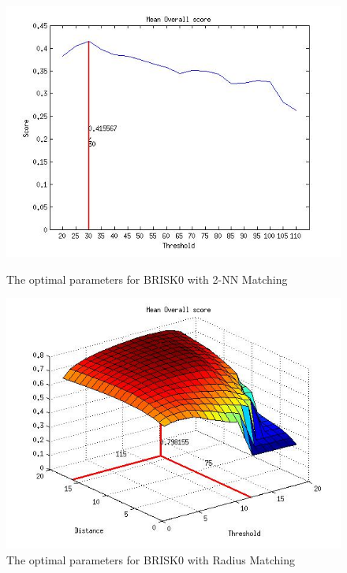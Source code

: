 \begin{figure}
\begin{minipage}[b]{0.5\linewidth}
\includegraphics[scale=0.4]{../Drawings/OptimalParameters_SBRISK_SBRISK_KNN.jpg}
\caption{The optimal parameters for BRISK0 with 2-NN Matching}
\label{fig:BRISK0knnOptimal}
\end{minipage}
\hspace{0.5cm}
\begin{minipage}[b]{0.5\linewidth}
\includegraphics[scale=0.4]{../Drawings/OptimalParameters_SBRISK_SBRISK_hamming.jpg}
\caption{The optimal parameters for BRISK0 with Radius Matching}
\label{fig:BRISK0hammingOptimal}
\end{minipage}

\end{figure}
